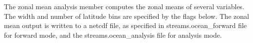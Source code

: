 The zonal mean analysis member computes the zonal means of several variables.  The width and number of latitude bins are specified by the flags below.  The zonal mean output is written to a netcdf file, as specified in streams.ocean\_forward file for forward mode, and the streams.ocean\_analysis file for analysis mode.
